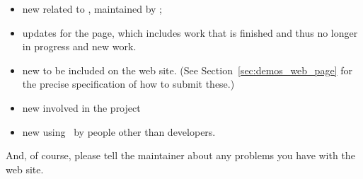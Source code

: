 \begin{itemize}
   \item new 
         related to \cgal, maintained by 
         ;
   \item updates for the 
         page, which includes work that is finished and thus no longer in 
         progress and new work.
   \item new 
         to be included on the web site. (See Section~\ref{sec:demos_web_page}
         for the precise specification of how to submit these.)
   \item new 
         involved in the project
   \item new 
         using \cgal\ by people other than developers.
\end{itemize}

And, of course, please tell the maintainer about any problems you have
with the web site.

